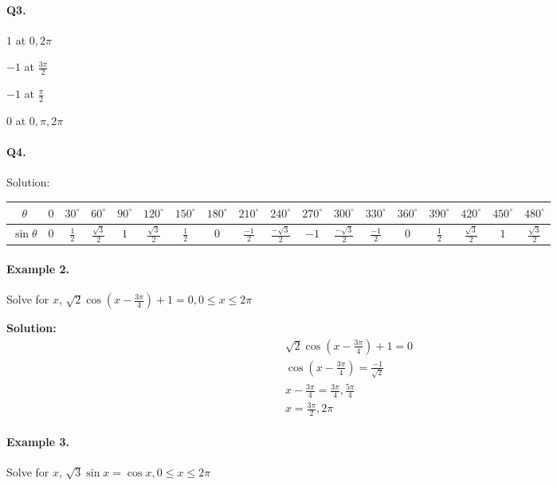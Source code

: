 \documentclass{article}
\begin{document}
\paragraph{Q3.}
\begin{enumerate*}[label=\alph*)]
          \item $1$ at $0, 2\pi$
          \item $-1$ at $\frac{3\pi}{2}$
          \item $-1$ at $\frac{\pi}{2}$
          \item $0$ at $0, \pi, 2\pi$
\end{enumerate*}

\paragraph{Q4.}
Solution:

\begin{tabular}{|c|c|c|c|c|c|c|c|c|c|c|c|c|c|c|c|c|c|}
  \hline
$\theta$ & $0$ & $30^{\circ}$ & $60^{\circ}$ & $90^{\circ}$ & $120^{\circ}$ & $150^{\circ}$ & $180^{\circ}$ & $210^{\circ}$ & $240^{\circ}$ & $270^{\circ}$ & $300^{\circ}$ & $330^{\circ}$ & $360^{\circ}$ & $390^{\circ}$ & $420^{\circ}$ & $450^{\circ}$ & $480^{\circ}$ \\
  \hline
$\sin\theta$ & $0$ & $\frac{1}{2}$ & $\frac{\sqrt{3}}{2}$ & $1$ & $\frac{\sqrt{3}}{2}$ & $\frac{1}{2}$ & $0$ & $\frac{-1}{2}$ & $\frac{-\sqrt{3}}{2}$ & $-1$ & $\frac{-\sqrt{3}}{2}$ & $\frac{-1}{2}$ & $0$ & $\frac{1}{2}$ & $\frac{\sqrt{3}}{2}$ & $1$ & $\frac{\sqrt{3}}{2}$ \\
  \hline
\end{tabular}

\paragraph{Example 2.}
Solve for $x$, $\sqrt{2}\cos\left( x - \frac{3\pi}{4} \right) + 1 = 0, 0 \leq x \leq 2\pi$

{\scriptsize \textbf{Solution:}}
\[
  \begin{aligned}
    \sqrt{2}\cos\left( x - \frac{3\pi}{4} \right) + 1 = 0 \\
    \cos \left( x - \frac{3\pi}{4} \right) = \frac{-1}{\sqrt{2}} \\
    x - \frac{3\pi}{4} = \frac{3\pi}{4}, \frac{5\pi}{4} \\
    x = \frac{3\pi}{2}, 2\pi
  \end{aligned}
\]

\paragraph{Example 3.}
Solve for $x$, $\sqrt{3}\sin x = \cos x, 0 \leq x \leq 2\pi$
\end{document}

